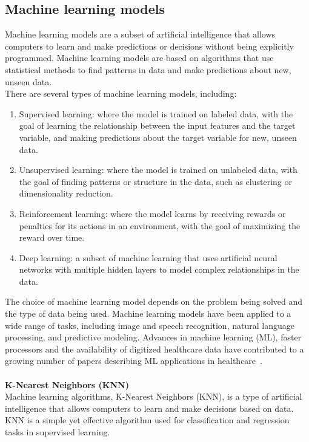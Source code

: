     \subsection{Machine learning models} \label{sec:ml}
    Machine learning models are a subset of artificial intelligence that allows computers to learn and make predictions or decisions without being
    explicitly programmed. Machine learning models are based on algorithms that use statistical methods to find patterns in data and make predictions
    about new, unseen data.
    \\
    There are several types of machine learning models, including:
    \begin{enumerate}
        \item Supervised learning: where the model is trained on labeled data, with the goal of learning the relationship between the input
        features and the target variable, and making predictions about the target variable for new, unseen data.
        \item Unsupervised learning: where the model is trained on unlabeled data, with the goal of finding patterns or structure in the data,
        such as clustering or dimensionality reduction.
        \item Reinforcement learning: where the model learns by receiving rewards or penalties for its actions in an environment,
        with the goal of maximizing the reward over time.
        \item Deep learning: a subset of machine learning that uses artificial neural networks with multiple hidden layers to model complex
        relationships in the data.
    \end{enumerate}
    The choice of machine learning model depends on the problem being solved and the type of data being used. Machine learning models have been
    applied to a wide range of tasks, including image and speech recognition, natural language processing, and predictive modeling.
    Advances in machine learning (ML), faster processors and the availability of digitized healthcare data have contributed to a growing
    number of papers describing ML applications in healthcare~\cite{Chen}.\\
    \\
    \textbf{K-Nearest Neighbors (KNN)} \label{sec:knn}\\
    Machine learning algorithms, K-Nearest Neighbors (KNN), is a type of artificial intelligence that allows computers to learn and make
    decisions based on data. KNN is a simple yet effective algorithm used for classification and regression tasks in supervised learning.\\
